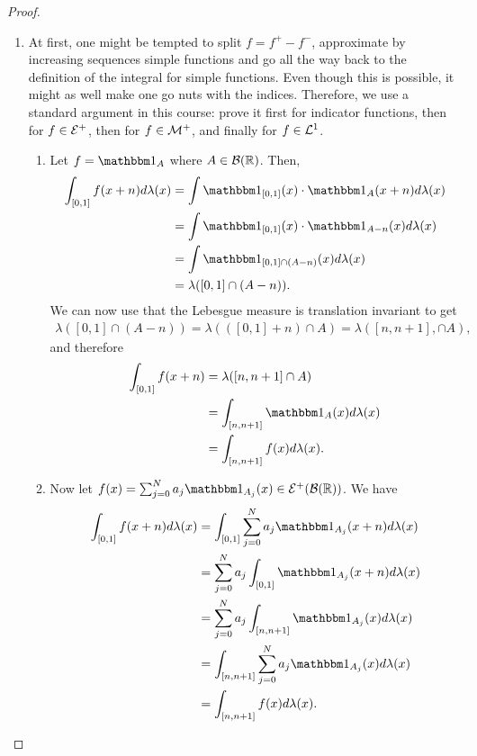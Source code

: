 \begin{proof}$ $\newline
	\begin{enumerate}
		\item At first, one might be tempted to split $f = f^+ - f^-$, approximate by increasing sequences simple functions and go all the way back to the definition of the integral for simple functions. Even though this is possible, it might as well make one go nuts with the indices. Therefore, we use a standard argument in this course: prove it first for indicator functions, then for $f \in \mathcal{E}^+$, then for $f \in \mathcal{M}^+$, and finally for $f \in \mathcal{L}^1$.
		\begin{enumerate}
			\item Let $f = \ind_A$ where $A \in \mathcal{B}(\mathbb{R})$. Then,
			\begin{align*}
				\int_{[0,1]} f(x + n) d\lambda (x)
				&= \int \ind_{[0,1]}(x) \cdot \ind_A(x + n) d\lambda(x)\\
				&= \int \ind_{[0,1]}(x) \cdot \ind_{A - n}(x)d\lambda(x)\\
				&= \int \ind_{[0,1] \cap (A - n)}(x) d\lambda(x)\\
				&= \lambda([0,1] \cap (A - n)).
			\end{align*}
			We can now use that the Lebesgue measure is translation invariant to get
			\begin{align*}
				\lambda([0,1] \cap (A - n))
				= \lambda(([0,1] + n) \cap A)
				= \lambda([n, n+1], \cap A),
			\end{align*}
			and therefore
			\begin{align*}
				\int_{[0,1]}f (x + n)
				&= \lambda([n, n + 1] \cap A)\\
				&= \int_{[n, n +1]} \ind_A(x)d\lambda(x)\\
				&= \int_{[n, n+1]} f(x)d\lambda(x).
			\end{align*}
			
			\item Now let $f(x) = \sum_{j=0}^N a_j \ind_{A_j}(x) \in \calE^+(\borel(\R))$. We have
			\begin{align*}
				\int_{[0,1]} f(x + n) d\lambda(x)
				&= \int_{[0,1]} \sum_{j = 0}^N a_j \ind_{A_j}(x + n)d\lambda(x)\\
				&= \sum_{j = 0}^N a_j \int_{[0,1]} \ind_{A_j}(x + n)d\lambda(x)\\
				&= \sum_{j = 0}^N a_j \int_{[n, n+1]} \ind_{A_j}(x) d\lambda(x)\\
				&= \int_{[n, n+1]} \sum_{j = 0}^N a_j \ind_{A_j}(x) d\lambda(x)\\
				&= \int_{[n, n+1]} f(x)d\lambda(x).
			\end{align*}
			

\end{enumerate}
\end{enumerate}
\end{proof}
